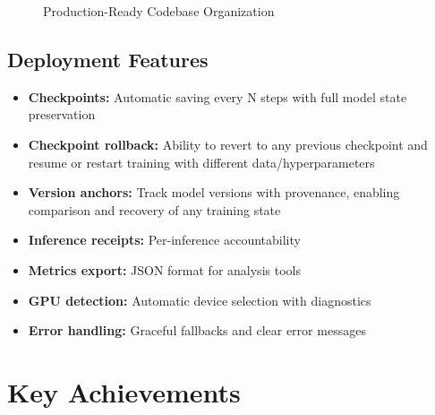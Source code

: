 \documentclass[11pt,a4paper]{article}
\begin{document}
\begin{figure}[H]
\centering
{}
\caption{Production-Ready Codebase Organization}
\label{fig:codebase}
\end{figure}

\subsection{Deployment Features}
\begin{itemize}
    \item \textbf{Checkpoints:} Automatic saving every N steps with full model state preservation
    \item \textbf{Checkpoint rollback:} Ability to revert to any previous checkpoint and resume or restart training with different data/hyperparameters
    \item \textbf{Version anchors:} Track model versions with provenance, enabling comparison and recovery of any training state
    \item \textbf{Inference receipts:} Per-inference accountability
    \item \textbf{Metrics export:} JSON format for analysis tools
    \item \textbf{GPU detection:} Automatic device selection with diagnostics
    \item \textbf{Error handling:} Graceful fallbacks and clear error messages
\end{itemize}

\section{Key Achievements}
\end{document}
